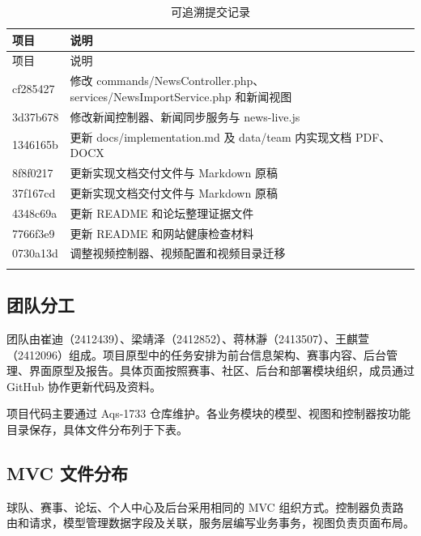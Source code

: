 \documentclass[UTF8,a4paper,11pt]{ctexart}
\begin{document}
\begin{longtable}{>{\raggedright\arraybackslash}p{}>{\raggedright\arraybackslash}p{}}\toprule 项目 & 说明\\\midrule\endfirsthead\toprule 项目 & 说明\\\midrule\endhead
cf285427 & 修改 commands/NewsController.php、services/NewsImportService.php 和新闻视图\\\midrule
3d37b678 & 修改新闻控制器、新闻同步服务与 news-live.js\\\midrule
1346165b & 更新 docs/implementation.md 及 data/team 内实现文档 PDF、DOCX\\\midrule
8f8f0217 & 更新实现文档交付文件与 Markdown 原稿\\\midrule
37f167cd & 更新实现文档交付文件与 Markdown 原稿\\\midrule
4348c69a & 更新 README 和论坛整理证据文件\\\midrule
7766f3e9 & 更新 README 和网站健康检查材料\\\midrule
0730a13d & 调整视频控制器、视频配置和视频目录迁移\\\midrule
\bottomrule\caption{可追溯提交记录}\end{longtable}
\subsection{团队分工}
团队由崔迪（2412439）、梁靖泽（2412852）、蒋林瀞（2413507）、王麒萱（2412096）组成。项目原型中的任务安排为前台信息架构、赛事内容、后台管理、界面原型及报告。具体页面按照赛事、社区、后台和部署模块组织，成员通过 GitHub 协作更新代码及资料。

项目代码主要通过 Aqs-1733 仓库维护。各业务模块的模型、视图和控制器按功能目录保存，具体文件分布列于下表。

\subsection{MVC 文件分布}
球队、赛事、论坛、个人中心及后台采用相同的 MVC 组织方式。控制器负责路由和请求，模型管理数据字段及关联，服务层编写业务事务，视图负责页面布局。
\end{document}
